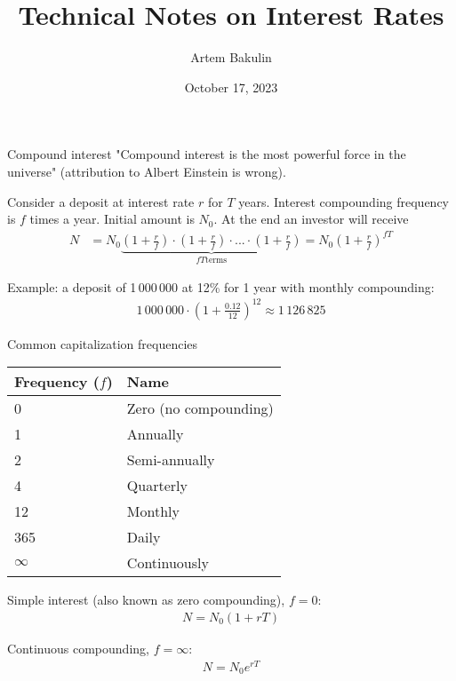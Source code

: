 \documentclass{beamer}
\title{Technical Notes on Interest Rates}
\author{Artem Bakulin}
\date{October 17, 2023}
\begin{document}
\begin{frame}
\titlepage
\end{frame}

\begin{frame}{Compound interest}
\justify
"Compound interest is the most powerful force in the universe" (attribution to Albert Einstein is wrong).

\justify
Consider a deposit at interest rate $r$ for $T$ years. Interest compounding frequency is $f$ times a year. Initial amount is $N_0$. At the end an investor will receive
\begin{align*}
N &= N_0\underbrace{\left(1 + \frac{r}{f}\right) \cdot \left(1 + \frac{r}{f}\right) \cdot ... \cdot \left(1 + \frac{r}{f}\right)}_{fT \text{terms}} = 
N_0\left(1 + \frac{r}{f}\right)^{fT}
\end{align*}

Example: a deposit of 1\,000\,000 at 12\% for 1 year with monthly compounding:
\begin{align*}
1\,000\,000 \cdot \left(1 + \frac{0.12}{12}\right)^{12} \approx 1\,126\,825
\end{align*}
\end{frame}



\begin{frame}{Common capitalization frequencies}
\centering
\begin{tabular}{l|l}
Frequency ($f$) & Name \\ \hline 
0 & Zero (no compounding) \\
1 & Annually \\
2 & Semi-annually \\
4 & Quarterly \\
12 & Monthly \\
365 & Daily \\
$\infty$ & Continuously 
\end{tabular}

\justify
Simple interest (also known as zero compounding), $f=0$:
\begin{align*}
N = N_0 (1 + rT)
\end{align*}

Continuous compounding, $f=\infty$:
\begin{align*}
N = N_0e^{rT}
\end{align*}
\end{frame}
\end{document}
